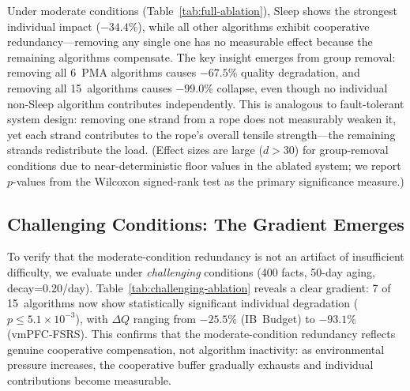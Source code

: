 \documentclass{article}
\begin{document}
Under moderate conditions (Table~\ref{tab:full-ablation}), Sleep shows
the strongest individual impact ($-34.4\%$), while all other algorithms
exhibit cooperative redundancy---removing any single one has no measurable
effect because the remaining algorithms compensate.
The key insight emerges from group removal:
removing all 6~PMA algorithms causes $-67.5\%$ quality degradation,
and removing all 15~algorithms causes $-99.0\%$ collapse,
even though no individual non-Sleep algorithm contributes independently.
This is analogous to fault-tolerant system design: removing one strand
from a rope does not measurably weaken it, yet each strand contributes
to the rope's overall tensile strength---the remaining strands redistribute
the load.
(Effect sizes are large ($d > 30$) for group-removal conditions
due to near-deterministic floor values in the ablated system;
we report $p$-values from the Wilcoxon signed-rank test as the
primary significance measure.)

\subsection{Challenging Conditions: The Gradient Emerges}

To verify that the moderate-condition redundancy is not an artifact of
insufficient difficulty, we evaluate under \emph{challenging} conditions
(400 facts, 50-day aging, decay=0.20/day).
Table~\ref{tab:challenging-ablation} reveals a clear gradient:
7 of 15~algorithms now show statistically significant individual
degradation ($p \le 5.1\times 10^{-3}$), with $\Delta Q$ ranging from $-25.5\%$
(IB~Budget) to $-93.1\%$ (vmPFC-FSRS).
This confirms that the moderate-condition redundancy reflects genuine
cooperative compensation, not algorithm inactivity: as environmental
pressure increases, the cooperative buffer gradually exhausts and
individual contributions become measurable.
\end{document}
